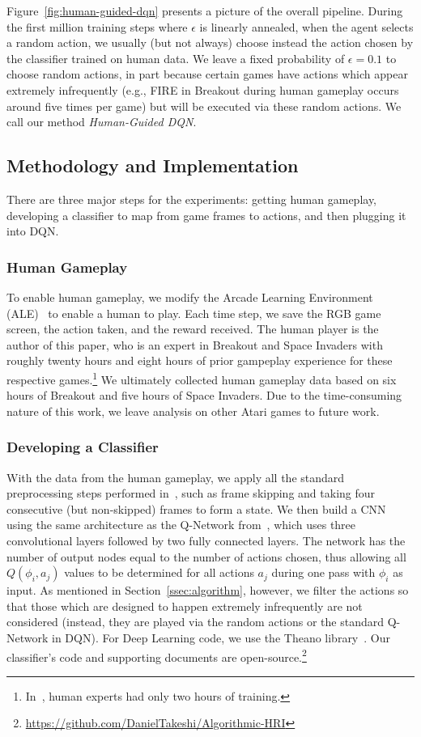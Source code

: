 \documentclass[letterpaper, 10pt, conference]{ieeeconf}
\begin{document}
Figure~\ref{fig:human-guided-dqn} presents a picture of the overall pipeline.
During the first million training steps where $\epsilon$ is linearly annealed,
when the agent selects a random action, we usually (but not always) choose
instead the action chosen by the classifier trained on human data. We leave a
fixed probability of $\epsilon=0.1$ to choose random actions, in part because
certain games have actions which appear extremely infrequently (e.g., FIRE in
Breakout during human gameplay occurs around five times per game) but will be
executed via these random actions. We call our method \emph{Human-Guided DQN}.

\subsection{Methodology and Implementation}\label{ssec:implementation}

There are three major steps for the experiments: getting human gameplay,
developing a classifier to map from game frames to actions, and then plugging it
into DQN. 

\subsubsection{Human Gameplay} To enable human gameplay, we modify the Arcade
Learning Environment (ALE)~\cite{bellemare13arcade} to enable a human to play.
Each time step, we save the RGB game screen, the action taken, and the reward
received. The human player is the author of this paper, who is an expert in
Breakout and Space Invaders with roughly twenty hours and eight hours of prior
gampeplay experience for these respective
games.\footnote{In~\cite{mnih-dqn-2015}, human experts had only two hours of
training.} We ultimately collected human gameplay data based on six hours of
Breakout and five hours of Space Invaders. Due to the time-consuming nature of
this work, we leave analysis on other Atari games to future work.

\subsubsection{Developing a Classifier} With the data from the human gameplay,
we apply all the standard preprocessing steps performed in~\cite{mnih-dqn-2015},
such as frame skipping and taking four consecutive (but non-skipped) frames to
form a state. We then build a CNN using the same architecture as the Q-Network
from~\cite{mnih-dqn-2015}, which uses three convolutional layers followed by two
fully connected layers. The network has the number of output nodes equal to the
number of actions chosen, thus allowing all $Q(\phi_i,a_j)$ values to be
determined for all actions $a_j$ during one pass with $\phi_i$ as input.  As
mentioned in Section~\ref{ssec:algorithm}, however, we filter the actions so
that those which are designed to happen extremely infrequently are not
considered (instead, they are played via the random actions or the standard
Q-Network in DQN). For Deep Learning code, we use the Theano
library~\cite{2016arXiv160502688short}.  Our classifier's code and supporting
documents are
open-source.\footnote{\url{https://github.com/DanielTakeshi/Algorithmic-HRI}}
\end{document}
